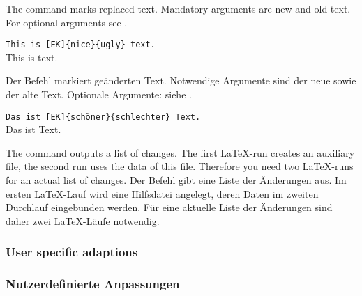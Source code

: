 \DescribeMacro{\replaced}
\ifENGLISH
 The command  marks replaced text.
 Mandatory arguments are new and old text.
 For optional arguments see .
 \begin{einspiel}
	\>
 \end{einspiel}
 \begin{einspiel}[true]
	\>\texttt{This is [EK]\{nice\}\{ugly\} text.}\\
	\>This is  text.
 \end{einspiel}
\fi
	\ifGERMAN
	 Der Befehl  markiert geänderten Text.
	 Notwendige Argumente sind der neue sowie der alte Text.
	 Optionale Argumente: siehe .
	 \begin{einspiel}
		\>
	 \end{einspiel}
	 \begin{einspiel}[true]
		\>\texttt{Das ist [EK]\{schöner\}\{schlechter\} Text.}\\
		\>Das ist  Text.
	 \end{einspiel}
	\fi

\DescribeMacro{\listofchanges}
\ifENGLISH
 The command  outputs a list of changes.
 The first \LaTeX-run creates an auxiliary file, the second run uses the data of this file.
 Therefore you need two \LaTeX-runs for an actual list of changes.
\fi
	\ifGERMAN
	 Der Befehl  gibt eine Liste der Änderungen aus.
	 Im ersten \LaTeX-Lauf wird eine Hilfsdatei angelegt, deren Daten im zweiten Durchlauf eingebunden werden.
	 Für eine aktuelle Liste der Änderungen sind daher zwei \LaTeX-Läufe notwendig.
	\fi
\begin{einspiel}
 \>
\end{einspiel}

\ifENGLISH
 \subsubsection{User specific adaptions}
\fi
	\ifGERMAN
	 \subsubsection{Nutzerdefinierte Anpassungen}
	\fi

